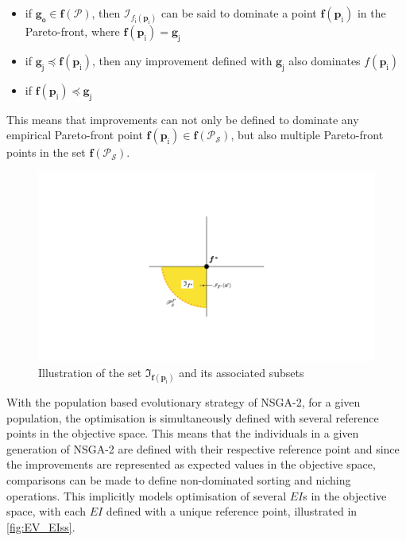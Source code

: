   \begin{itemize}
  \item if $\bm g_{\mathsf{o}} \in \bm f(\mathscr{P})$, then $\mathscr{I}_{f_{\mathsf{i}}(\bm{p}_{\mathrm i})}$ can be said to dominate a point $\bm f(\bm p_{\mathrm{i}})$ in the Pareto-front,  where $\bm f(\bm p_{\mathrm{i}}) = \bm g_{\mathsf{j}}$
  \item if $\bm g_{\mathsf{j}} \preceq \bm f(\bm p_{\mathrm{i}})$, then any improvement defined with $\bm g_{\mathsf{j}}$ also dominates $f(\bm p_{\mathrm{i}})$ 
   \item if $\bm f(\bm p_{\mathrm{i}}) \preceq \bm g_{\mathsf{j}}$

  \end{itemize}
  \fi
  This means that improvements can not only be defined to dominate any empirical Pareto-front point $\bm f({\bm{p}_{\mathrm{i}}}) \in \bm f  (\mathscr{P}_{\mathcal{S}})$, but also multiple Pareto-front points in the set $\bm f(\mathscr{P}_{\mathcal{S}})$.\\
  
  \begin{figure}
     \centering
    \includegraphics[scale=0.35]{Chapter5/Pictures/improv_illus}
    \caption{Illustration of the set $\mathfrak{I}_{\bm f(\bm{p}_{\mathrm i})}$ and its associated subsets}
    \label{fig:improv_illus}
 \end{figure}
  
 With the population based evolutionary strategy of NSGA-2, for a given population, the optimisation is simultaneously defined with several reference points in the objective space. This means that the individuals in a given generation of NSGA-2 are defined with their respective reference point and since the improvements are represented as expected values in the objective space, comparisons can be made to define non-dominated sorting and niching operations. This implicitly models optimisation of several $EI$s in the objective space, with each $EI$ defined with a unique reference point, illustrated in \ref{fig:EV_EIss}. \\
  

